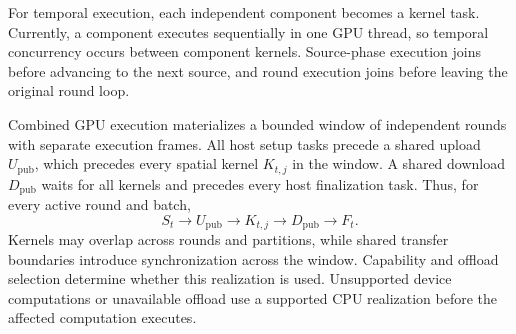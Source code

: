 For temporal execution, each independent component becomes a kernel
task. Currently, a component executes sequentially in one GPU thread,
so temporal concurrency occurs between component kernels. Source-phase
execution joins before advancing to the next source, and round execution
joins before leaving the original round loop.

Combined GPU execution materializes a bounded window of independent
rounds with separate execution frames. All host setup tasks precede a
shared upload $U_{\mathrm{pub}}$, which precedes every spatial kernel
$K_{t,j}$ in the window. A shared download $D_{\mathrm{pub}}$ waits for
all kernels and precedes every host finalization task. Thus, for every
active round and batch,
\[
S_t\longrightarrow U_{\mathrm{pub}}
\longrightarrow K_{t,j}\longrightarrow D_{\mathrm{pub}}
\longrightarrow F_t.
\]
Kernels may overlap across rounds and partitions, while shared transfer
boundaries introduce synchronization across the window. Capability and
offload selection determine whether this realization is used.
Unsupported device computations or unavailable offload use a supported
CPU realization before the affected computation executes.

